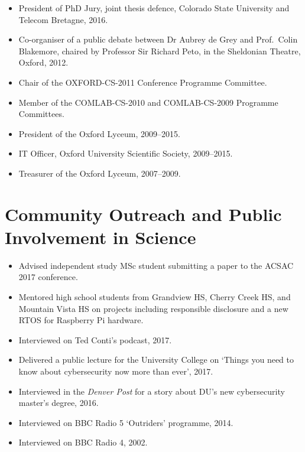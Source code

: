 \documentclass[12pt,twoside,letterpaper]{article}
\begin{document}
\begin{itemize}
    \item President of PhD Jury, joint thesis defence, Colorado
        State University and Telecom Bretagne, 2016.
	\item Co-organiser of a public debate between Dr Aubrey de Grey
		and Prof.\ Colin Blakemore, chaired by Professor Sir Richard
		Peto, in the Sheldonian Theatre, Oxford, 2012.
	\item Chair of the OXFORD-CS-2011 Conference Programme Committee.
	\item Member of the COMLAB-CS-2010 and COMLAB-CS-2009 Programme
		Committees.
	\item President of the Oxford Lyceum, 2009--2015.
	\item IT Officer, Oxford University Scientific Society, 2009--2015.
	\item Treasurer of the Oxford Lyceum, 2007--2009.
\end{itemize}

\vspace{-7mm}
\section*{Community Outreach and Public Involvement in Science}
\vspace{-2mm}

\begin{itemize}
    \item Advised independent study MSc student submitting a paper to the
        ACSAC 2017 conference.
    \item Mentored high school students from Grandview HS, Cherry Creek HS,
        and Mountain Vista HS on projects including responsible disclosure
        and a new RTOS for Raspberry Pi hardware.
    \item Interviewed on Ted Conti's podcast, 2017.
    \item Delivered a public lecture for the University College on `Things
        you need to know about cybersecurity now more than ever', 2017.
    \item Interviewed in the \emph{Denver Post} for a story about DU's new
        cybersecurity master's degree, 2016.
    \item Interviewed on BBC Radio 5 `Outriders' programme, 2014.
    \item Interviewed on BBC Radio 4, 2002.
\end{itemize}

\vspace{-7mm}
\end{document}
